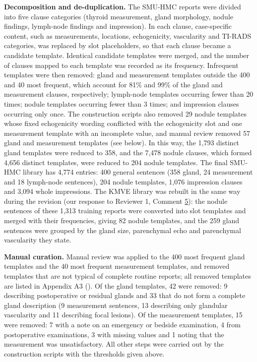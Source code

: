 \textbf{Decomposition and de-duplication.} The SMU-HMC reports were divided into five clause categories (thyroid measurement, gland morphology, nodule findings, lymph-node findings and impression). In each clause, case-specific content, such as measurements, locations, echogenicity, vascularity and TI-RADS categories, was replaced by slot placeholders, so that each clause became a candidate template. Identical candidate templates were merged, and the number of clauses mapped to each template was recorded as its frequency. Infrequent templates were then removed: gland and measurement templates outside the 400 and 40 most frequent, which account for 81\% and 99\% of the gland and measurement clauses, respectively; lymph-node templates occurring fewer than 20 times; nodule templates occurring fewer than 3 times; and impression clauses occurring only once. The construction scripts also removed 29 nodule templates whose fixed echogenicity wording conflicted with the echogenicity slot and one measurement template with an incomplete value, and manual review removed 57 gland and measurement templates (see below). In this way, the 1,793 distinct gland templates were reduced to 358, and the 7,478 nodule clauses, which formed 4,656 distinct templates, were reduced to 204 nodule templates. The final SMU-HMC library has 4,774 entries: 400 general sentences (358 gland, 24 measurement and 18 lymph-node sentences), 204 nodule templates, 1,076 impression clauses and 3,094 whole impressions. The KMVE library was rebuilt in the same way during the revision (our response to Reviewer 1, Comment \hyperref[rev:R1.5]{5}): the nodule sentences of these 1,313 training reports were converted into slot templates and merged with their frequencies, giving 82 nodule templates, and the 259 gland sentences were grouped by the gland size, parenchymal echo and parenchymal vascularity they state.\par

\textbf{Manual curation.} Manual review was applied to the 400 most frequent gland templates and the 40 most frequent measurement templates, and removed templates that are not typical of complete routine reports; all removed templates are listed in Appendix A3 (). Of the gland templates, 42 were removed: 9 describing postoperative or residual glands and 33 that do not form a complete gland description (9 measurement sentences, 13 describing only glandular vascularity and 11 describing focal lesions). Of the measurement templates, 15 were removed: 7 with a note on an emergency or bedside examination, 4 from postoperative examinations, 3 with missing values and 1 noting that the measurement was unsatisfactory. All other steps were carried out by the construction scripts with the thresholds given above.\par

